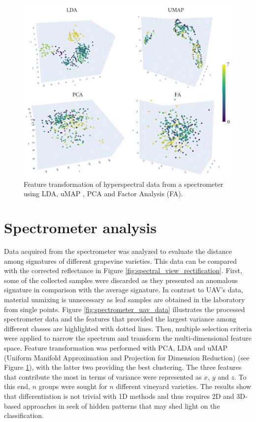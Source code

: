 \begin{figure}[ht]
    \centering
    \includegraphics[width=\linewidth]{figs/vineyard_classification/feature_reduction.png}
	\caption{Feature transformation of hyperspectral data from a spectrometer using LDA, uMAP \cite{mcinnes_umap_2020}, PCA and Factor Analysis (FA).  }
	\label{fig:feature_reduction_spectrometer}
\end{figure}

\section{Spectrometer analysis}

Data acquired from the spectrometer was analyzed to evaluate the distance among signatures of different grapevine varieties. This data can be compared with the corrected reflectance in Figure \ref{fig:spectral_view_rectification}. First, some of the collected samples were discarded as they presented an anomalous signature in comparison with the average signature. In contrast to UAV's data, material unmixing is unnecessary as leaf samples are obtained in the laboratory from single points. Figure \ref{fig:spectrometer_uav_data} illustrates the processed spectrometer data and the features that provided the largest variance among different classes are highlighted with dotted lines. Then, multiple selection criteria were applied to narrow the spectrum and transform the multi-dimensional feature space. Feature transformation was performed with PCA, LDA and uMAP (Uniform Manifold Approximation and Projection for Dimension Reduction) (see Figure \ref{fig:feature_reduction_spectrometer}), with the latter two providing the best clustering. The three features that contribute the most in terms of variance were represented as $x$, $y$ and $z$. To this end, $n$ groups were sought for $n$ different vineyard varieties. The results show that differentiation is not trivial with 1D methods and thus requires 2D and 3D-based approaches in seek of hidden patterns that may shed light on the classification.

